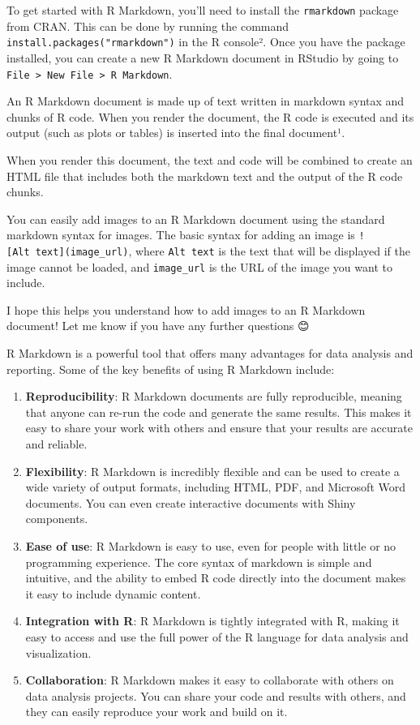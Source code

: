 \documentclass[
]{book}
\begin{document}
To get started with R Markdown, you'll need to install the \texttt{rmarkdown} package from CRAN. This can be done by running the command \texttt{install.packages("rmarkdown")} in the R console². Once you have the package installed, you can create a new R Markdown document in RStudio by going to \texttt{File\ \textgreater{}\ New\ File\ \textgreater{}\ R\ Markdown}.

An R Markdown document is made up of text written in markdown syntax and chunks of R code. When you render the document, the R code is executed and its output (such as plots or tables) is inserted into the final document¹.

When you render this document, the text and code will be combined to create an HTML file that includes both the markdown text and the output of the R code chunks.

You can easily add images to an R Markdown document using the standard markdown syntax for images. The basic syntax for adding an image is \texttt{!{[}Alt\ text{]}(image\_url)}, where \texttt{Alt\ text} is the text that will be displayed if the image cannot be loaded, and \texttt{image\_url} is the URL of the image you want to include.

I hope this helps you understand how to add images to an R Markdown document! Let me know if you have any further questions 😊

R Markdown is a powerful tool that offers many advantages for data analysis and reporting. Some of the key benefits of using R Markdown include:

\begin{enumerate}
\def\labelenumi{\arabic{enumi}.}
\item
  \textbf{Reproducibility}: R Markdown documents are fully reproducible, meaning that anyone can re-run the code and generate the same results. This makes it easy to share your work with others and ensure that your results are accurate and reliable.
\item
  \textbf{Flexibility}: R Markdown is incredibly flexible and can be used to create a wide variety of output formats, including HTML, PDF, and Microsoft Word documents. You can even create interactive documents with Shiny components.
\item
  \textbf{Ease of use}: R Markdown is easy to use, even for people with little or no programming experience. The core syntax of markdown is simple and intuitive, and the ability to embed R code directly into the document makes it easy to include dynamic content.
\item
  \textbf{Integration with R}: R Markdown is tightly integrated with R, making it easy to access and use the full power of the R language for data analysis and visualization.
\item
  \textbf{Collaboration}: R Markdown makes it easy to collaborate with others on data analysis projects. You can share your code and results with others, and they can easily reproduce your work and build on it.
\end{enumerate}
\end{document}
